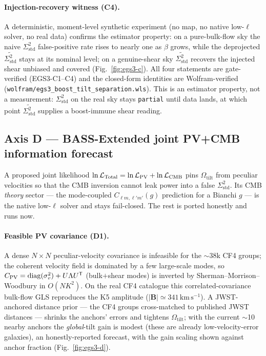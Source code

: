 \documentclass[11pt,a4paper]{article}
\newcommand{\Sigstd}{\Sigma^{2}_{\mathrm{std}}}
\newcommand{\Otilt}{\Omega_{\mathrm{tilt}}}
\theoremstyle{plain}
\theoremstyle{definition}
\begin{document}
\paragraph{Injection-recovery witness (C4).}
A deterministic, moment-level synthetic experiment (no map, no native low-$\ell$
solver, no real data) confirms the estimator property: on a pure-bulk-flow sky the
naive $\Sigstd$ false-positive rate rises to nearly one as $\beta$ grows, while the
deprojected $\widetilde{\Sigstd}$ stays at its nominal level; on a genuine-shear sky
$\widetilde{\Sigstd}$ recovers the injected shear unbiased and covered
(Fig.~\ref{fig:egs3-c}). All four statements are gate-verified (EGS3-C1--C4) and
the closed-form identities are Wolfram-verified
(\texttt{wolfram/egs3\_boost\_tilt\_separation.wls}). This is an estimator property,
not a measurement: $\Sigstd$ on the real sky stays \texttt{partial} until data
lands, at which point $\widetilde{\Sigstd}$ supplies a boost-immune shear reading.

\subsection{Axis D --- BASS-Extended joint PV+CMB information forecast}
\label{sec:axis-d}

A proposed joint likelihood $\ln\mathcal{L}_{\rm Total}=\ln\mathcal{L}_{\rm PV}+\ln\mathcal{L}_{\rm CMB}$
pins $\Otilt$ from peculiar velocities so that the CMB inversion cannot leak power into a
false $\Sigstd$. Its CMB \emph{theory} sector --- the mode-coupled $C_{\ell m,\ell'm'}(g)$
prediction for a Bianchi $g$ --- is the native low-$\ell$ solver and stays fail-closed. The
rest is ported honestly and runs now.

\paragraph{Feasible PV covariance (D1).}
A dense $N\times N$ peculiar-velocity covariance is infeasible for the $\sim$38k CF4 groups;
the coherent velocity field is dominated by a few large-scale modes, so
$C_{\rm PV}=\operatorname{diag}(\sigma_v^2)+U\Lambda U^{\mathsf T}$ (bulk$+$shear modes) is
inverted by Sherman--Morrison--Woodbury in $O(NK^2)$. On the real CF4 catalogue this
correlated-covariance bulk-flow GLS reproduces the K5 amplitude
($|\mathbf B|\simeq341\,\mathrm{km\,s^{-1}}$). A JWST-anchored distance prior --- the CF4
groups cross-matched to published JWST distances --- shrinks the anchors' errors and tightens
$\Otilt$; with the current $\sim$10 nearby anchors the \emph{global}-tilt gain is modest
(these are already low-velocity-error galaxies), an honestly-reported forecast, with the gain
scaling shown against anchor fraction (Fig.~\ref{fig:egs3-d}).
\end{document}
